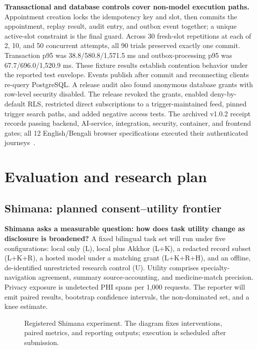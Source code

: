 \documentclass[12pt,twocolumn,a4paper]{article}
\begin{document}
\textbf{Transactional and database controls cover non-model execution paths.} Appointment
creation locks the idempotency key and slot, then commits the appointment, replay result,
audit entry, and outbox event together; a unique active-slot constraint is the final guard.
Across 30 fresh-slot repetitions at each of 2, 10, and 50 concurrent attempts, all 90 trials
preserved exactly one commit. Transaction p95 was 38.8/580.8/1,571.5 ms and outbox-processing
p95 was 67.7/696.0/1,520.9 ms. These fixture results establish contention behavior under the
reported test envelope. Events publish after commit and reconnecting clients re-query PostgreSQL. A release
audit also found anonymous database grants with row-level security disabled. The release
revoked the grants, enabled deny-by-default RLS, restricted direct subscriptions to a
trigger-maintained feed, pinned trigger search paths, and added negative access tests.
The archived v1.0.2 receipt records passing backend, AI-service, integration, security,
container, and frontend gates; all 12 English/Bengali browser specifications executed their
authenticated journeys~\cite{medoraarchive}.

\section{Evaluation and research plan}

\subsection{Shimana: planned consent--utility frontier}

\textbf{Shimana asks a measurable question: how does task utility change as disclosure is
broadened?} A fixed bilingual task set will run under five configurations: local only (L), local
plus Akkhor (L+K), a redacted record subset (L+K+R), a hosted model under a matching grant
(L+K+R+H), and an offline, de-identified unrestricted research control (U). Utility comprises specialty-navigation
agreement, summary source-accounting, and medicine-match precision. Privacy exposure is
undetected PHI spans per 1,000 requests. The reporter will emit paired results, bootstrap confidence
intervals, the non-dominated set, and a knee estimate.

\begin{figure}[!t]
\centering
\resizebox{.70\textwidth}{!}{}
\caption{Registered Shimana experiment. The diagram fixes interventions, paired metrics,
and reporting outputs; execution is scheduled after submission.}
\label{fig:shimana}
\end{figure}
\end{document}
